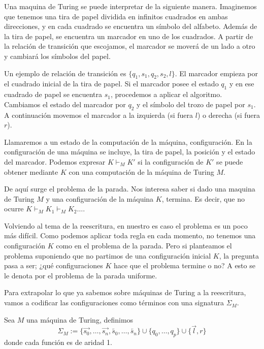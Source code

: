 Una maquina de Turing se puede interpretar de la siguiente
manera. Imaginemos que tenemos una tira de papel dividida en infinitos
cuadrados en ambas direcciones, y en cada cuadrado se encuentra un símbolo del
alfabeto. Además de la tira de papel, se encuentra un marcador en uno
de los cuadrados. A partir de la relación de transición que escojamos,
el marcador se moverá de un lado a otro y cambiará los símbolos del
papel. 

Un ejemplo de relación de transición es $\{ q_1, s_1, q_2, s_2, l
\}$. El marcador empieza por el cuadrado inicial de la tira de
papel. Si el marcador posee el estado $q_1$ y en ese cuadrado de
papel se encuentra $s_1$, procedemos a aplicar el algoritmo. Cambiamos
el estado del marcador por $q_2$ y el símbolo del trozo de papel por
$s_1$. A continuación movemos el marcador a la izquierda (si fuera
$l$) o derecha (si fuera $r$).


Llamaremos a un estado de la computación de la máquina,
configuración. En la configuración de una máquina se incluye, la tira
de papel, la posición y el estado del marcador. Podemos expresar
$K \vdash_M K'$ si la configuración de $K'$ se puede obtener mediante
$K$ con una computación de la máquina de Turing $M$.

De aquí surge el problema de la parada. Nos interesa saber si dado una
maquina de Turing $M$ y una configuración de la máquina $K$,
termina. Es decir, que no ocurre $K \vdash_M K_1 \vdash_M K_2 \dots$.

Volviendo al tema de la reescritura, en nuestro es caso el problema es
un poco más difícil. Como podemos aplicar toda regla en cada momento,
no tenemos una configuración $K$ como en el problema de la
parada. Pero si planteamos el problema suponiendo que no partimos de
una configuración inicial $K$, la pregunta pasa a ser; ¿qué
configuraciones $K$ hace que el problema termine o no? A esto se le
denota por el problema de la parada uniforme. 

Para extrapolar lo que ya sabemos sobre máquinas de Turing a la
reescritura, vamos a codificar las configuraciones como términos con
una signatura $\Sigma_M$.

\begin{defi}
Sea $M$ una máquina de Turing, definimos 
\[
  \Sigma_M := \{ \overrightarrow{s_0}, \dots, \overrightarrow{s_n},
  \overleftarrow{s_0}, \dots, \overleftarrow{s_n} \} \cup \{q_0,
  \dots, q_p \} \cup \{\overrightarrow{l}, r \}
\]
donde cada función es de aridad 1.
\end{defi}

